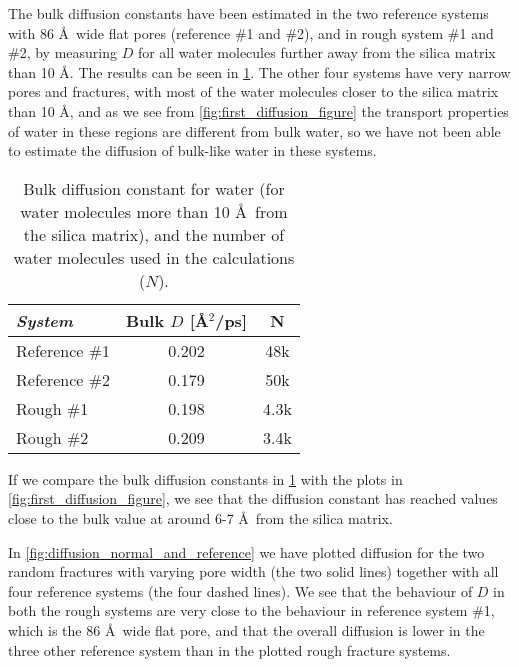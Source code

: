The bulk diffusion constants have been estimated in the two reference systems with 86 \AA\ wide flat pores (reference \#1 and \#2), and in rough system \#1 and \#2, by measuring $D$ for all water molecules further away from the silica matrix than 10 \AA. The results can be seen in \cref{tab:bulk_water_diffusion}. The other four systems have very narrow pores and fractures, with most of the water molecules closer to the silica matrix than 10 \AA, and as we see from \cref{fig:first_diffusion_figure} the transport properties of water in these regions are different from bulk water, so we have not been able to estimate the diffusion of bulk-like water in these systems.
%
\begin{table}[!htb]%
    \centering%
    \begin{tabular}{l|cc}%
        \textit{System} & Bulk $D$ [\AA$^2$/ps] & N    \\\hline
        Reference \#1   & 0.202                 & 48k  \\ %
        Reference \#2   & 0.179                 & 50k  \\ %
        Rough \#1       & 0.198                 & 4.3k \\ %
        Rough \#2       & 0.209                 & 3.4k \\ %
    \end{tabular}%
    \vspace{8pt}%
    \caption{%
        Bulk diffusion constant for water (for water molecules more than 10 \AA\ from the silica matrix), and the number of water molecules used in the calculations ($N$). %
        \label{tab:bulk_water_diffusion}%
    }%
\end{table}

If we compare the bulk diffusion constants in \cref{tab:bulk_water_diffusion} with the plots in \cref{fig:first_diffusion_figure}, we see that the diffusion constant has reached values close to the bulk value at around 6-7 \AA\ from the silica matrix.

In \cref{fig:diffusion_normal_and_reference} we have plotted diffusion for the two random fractures with varying pore width (the two solid lines) together with all four reference systems (the four dashed lines). We see that the behaviour of $D$ in both the rough systems are very close to the behaviour in reference system \#1, which is the 86 \AA\ wide flat pore, and that the overall diffusion is lower in the three other reference system than in the plotted rough fracture systems.

